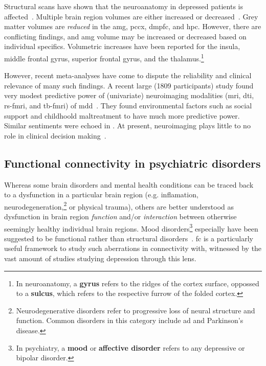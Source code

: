 Structural scans have shown that the neuroanatomy in depressed patients is affected~\parencite{Drevets2000}.
Multiple brain region volumes are either increased or decreased~\parencite{Sacher2012, Schmaal2020}.
Grey matter volumes are \emph{reduced} in the \gls{amg}, \gls{pccx}, \gls{dmpfc}, and \gls{hpc}.
However, there are conflicting findings, and \gls{amg} volume may be increased or decreased based on individual specifics.
Volumetric increases have been reported for the insula, middle frontal gyrus, superior frontal gyrus, and the thalamus.\footnote{In neuroanatomy, a \textbf{gyrus} refers to the ridges of the cortex surface, oppossed to a \textbf{sulcus}, which refers to the respective furrow of the folded cortex.}

However, recent meta-analyses have come to dispute the reliability and clinical relevance of many such findings.
A recent large (1809 participants) study found very modest predictive power of (univariate) neuroimaging modalities (\gls{mri}, \gls{dti}, \gls{rs-fmri}, and \gls{tb-fmri}) of \gls{mdd}~\parencite{Winter2022}.
They found environmental factors such as social support and childhoold maltreatment to have much more predictive power.
Similar sentiments were echoed in \textcite{Nour2022}.
At present, neuroimaging plays little to no role in clinical decision making~\parencite{Kapur2012}.

\subsection{Functional connectivity in psychiatric disorders}
\label{subsec:fc-depression}

Whereas some brain disorders and mental health conditions can be traced back to a dysfunction in a particular brain region (e.g. inflamation, neurodegeneration,\footnote{Neurodegenerative disorders refer to progressive loss of neural structure and function. Common disorders in this category include \gls{ad} and Parkinson's disease.} or physical trauma), others are better understood as dysfunction in brain region \emph{function} and/or \emph{interaction} between otherwise seemingly healthy individual brain regions.
Mood disorders\footnote{In psychiatry, a \textbf{mood} or \textbf{affective disorder} refers to any depressive or bipolar disorder.} especially have been suggested to be functional rather than structural disorders~\parencite{Piguet2021}.
\Gls{fc} is a particularly useful framework to study such aberrations in connectivity with, witnessed by the vast amount of studies studying depression through this lens.

